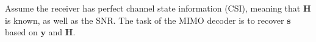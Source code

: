 \documentclass[12pt,letter,final]{article}
\begin{document}
\begin{spacing}{2.5}
Assume the receiver has perfect channel state information (CSI), meaning that $ \mathbf{H}$ is known, as well as the SNR. The task of the MIMO decoder is to recover $\mathbf{s}$ based on $\mathbf{y}$ and $\mathbf{H}$.



%
%



%
%



\end{spacing}
\end{document}
